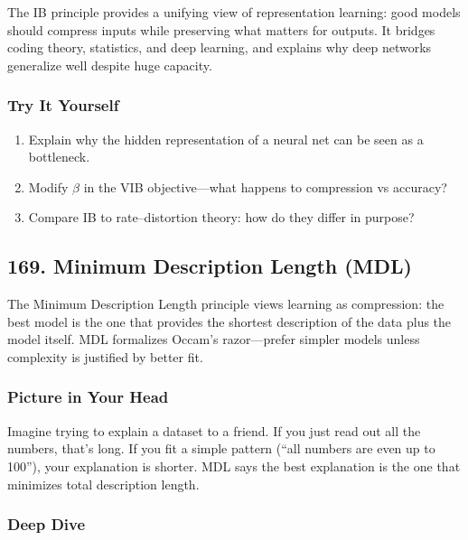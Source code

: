 \documentclass[
  letterpaper,
  DIV=11,
  numbers=noendperiod]{scrreprt}
\providecommand{\tightlist}{%
  \setlength{\itemsep}{0pt}\setlength{\parskip}{0pt}}
\begin{document}
The IB principle provides a unifying view of representation learning:
good models should compress inputs while preserving what matters for
outputs. It bridges coding theory, statistics, and deep learning, and
explains why deep networks generalize well despite huge capacity.

\subsubsection{Try It Yourself}\label{try-it-yourself-167}

\begin{enumerate}
\def\labelenumi{\arabic{enumi}.}
\tightlist
\item
  Explain why the hidden representation of a neural net can be seen as a
  bottleneck.
\item
  Modify \(\beta\) in the VIB objective---what happens to compression vs
  accuracy?
\item
  Compare IB to rate--distortion theory: how do they differ in purpose?
\end{enumerate}

\subsection{169. Minimum Description Length
(MDL)}\label{minimum-description-length-mdl}

The Minimum Description Length principle views learning as compression:
the best model is the one that provides the shortest description of the
data plus the model itself. MDL formalizes Occam's razor---prefer
simpler models unless complexity is justified by better fit.

\subsubsection{Picture in Your Head}\label{picture-in-your-head-168}

Imagine trying to explain a dataset to a friend. If you just read out
all the numbers, that's long. If you fit a simple pattern (``all numbers
are even up to 100''), your explanation is shorter. MDL says the best
explanation is the one that minimizes total description length.

\subsubsection{Deep Dive}\label{deep-dive-168}
\end{document}
